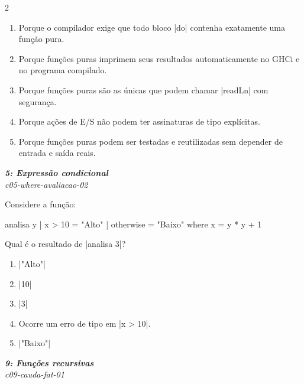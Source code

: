 \documentclass[a4paper,10pt,brazil]{article}
\begin{document}
\begin{multicols}{2}
\begin{enumerate}
  \item Porque o compilador exige que todo bloco \haskellinline|do| contenha exatamente uma função pura.

  \item Porque funções puras imprimem seus resultados automaticamente no GHCi e no programa compilado.

  \item Porque funções puras são as únicas que podem chamar \haskellinline|readLn| com segurança.

  \item Porque ações de E/S não podem ter assinaturas de tipo explícitas.

  \item Porque funções puras podem ser testadas e reutilizadas sem depender de entrada e saída reais.


\end{enumerate}

\begin{flushright}
  \footnotesize
  \textit{\textbf{5: Expressão condicional}}\\
  \textit{c05-where-avaliacao-02}\\

\end{flushright}
Considere a função:
\begin{haskellcode}
analisa y
  | x > 10    = "Alto"
  | otherwise = "Baixo"
  where
    x = y * y + 1
\end{haskellcode}
Qual é o resultado de \haskellinline|analisa 3|?

\begin{enumerate}
  \item \haskellinline|"Alto"|

  \item \haskellinline|10|

  \item \haskellinline|3|

  \item Ocorre um erro de tipo em \haskellinline|x > 10|.

  \item \haskellinline|"Baixo"|


\end{enumerate}

\begin{flushright}
  \footnotesize
  \textit{\textbf{9: Funções recursivas}}\\
  \textit{c09-cauda-fat-01}\\


\end{flushright}
\end{multicols}
\end{document}
